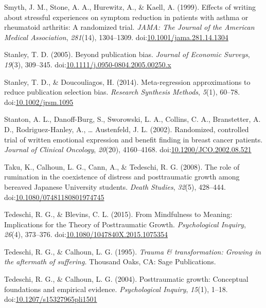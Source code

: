 \documentclass[,man]{apa6}
\begin{document}
\leavevmode\hypertarget{ref-Smyth1999}{}%
Smyth, J. M., Stone, A. A., Hurewitz, A., \& Kaell, A. (1999). Effects of writing about stressful experiences on symptom reduction in patients with asthma or rheumatoid arthritis: A randomized trial. \emph{JAMA: The Journal of the American Medical Association}, \emph{281}(14), 1304--1309. doi:\href{https://doi.org/10.1001/jama.281.14.1304}{10.1001/jama.281.14.1304}

\leavevmode\hypertarget{ref-Stanley2005}{}%
Stanley, T. D. (2005). Beyond publication bias. \emph{Journal of Economic Surveys}, \emph{19}(3), 309--345. doi:\href{https://doi.org/10.1111/j.0950-0804.2005.00250.x}{10.1111/j.0950-0804.2005.00250.x}

\leavevmode\hypertarget{ref-Stanley2014}{}%
Stanley, T. D., \& Doucouliagos, H. (2014). Meta-regression approximations to reduce publication selection bias. \emph{Research Synthesis Methods}, \emph{5}(1), 60--78. doi:\href{https://doi.org/10.1002/jrsm.1095}{10.1002/jrsm.1095}

\leavevmode\hypertarget{ref-Stanton2002}{}%
Stanton, A. L., Danoff-Burg, S., Sworowski, L. A., Collins, C. A., Branstetter, A. D., Rodriguez-Hanley, A., \ldots{} Austenfeld, J. L. (2002). Randomized, controlled trial of written emotional expression and benefit finding in breast cancer patients. \emph{Journal of Clinical Oncology}, \emph{20}(20), 4160--4168. doi:\href{https://doi.org/10.1200/JCO.2002.08.521}{10.1200/JCO.2002.08.521}

\leavevmode\hypertarget{ref-Taku2008}{}%
Taku, K., Calhoun, L. G., Cann, A., \& Tedeschi, R. G. (2008). The role of rumination in the coexistence of distress and posttraumatic growth among bereaved Japanese University students. \emph{Death Studies}, \emph{32}(5), 428--444. doi:\href{https://doi.org/10.1080/07481180801974745}{10.1080/07481180801974745}

\leavevmode\hypertarget{ref-Tedeschi2015}{}%
Tedeschi, R. G., \& Blevins, C. L. (2015). From Mindfulness to Meaning: Implications for the Theory of Posttraumatic Growth. \emph{Psychological Inquiry}, \emph{26}(4), 373--376. doi:\href{https://doi.org/10.1080/1047840X.2015.1075354}{10.1080/1047840X.2015.1075354}

\leavevmode\hypertarget{ref-Tedeschi1995}{}%
Tedeschi, R. G., \& Calhoun, L. G. (1995). \emph{Trauma \& transformation: Growing in the aftermath of suffering.} Thousand Oaks, CA: Sage Publications.

\leavevmode\hypertarget{ref-Tedeschi2004}{}%
Tedeschi, R. G., \& Calhoun, L. G. (2004). Posttraumatic growth: Conceptual foundations and empirical evidence. \emph{Psychological Inquiry}, \emph{15}(1), 1--18. doi:\href{https://doi.org/10.1207/s15327965pli1501}{10.1207/s15327965pli1501}
\end{document}
